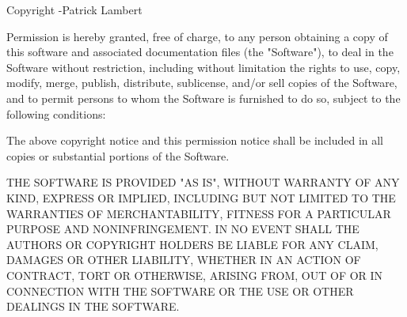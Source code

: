 \documentclass[11pt]{article}
\begin{document}
Copyright \textcopyright {}-\the\year \thinspace Patrick Lambert

Permission is hereby granted, free of charge, to any person obtaining a copy
of this software and associated documentation files (the "Software"), to deal
in the Software without restriction, including without limitation the rights
to use, copy, modify, merge, publish, distribute, sublicense, and/or sell
copies of the Software, and to permit persons to whom the Software is
furnished to do so, subject to the following conditions:

The above copyright notice and this permission notice shall be included in
all copies or substantial portions of the Software.

THE SOFTWARE IS PROVIDED "AS IS", WITHOUT WARRANTY OF ANY KIND, EXPRESS OR
IMPLIED, INCLUDING BUT NOT LIMITED TO THE WARRANTIES OF MERCHANTABILITY,
FITNESS FOR A PARTICULAR PURPOSE AND NONINFRINGEMENT. IN NO EVENT SHALL THE
AUTHORS OR COPYRIGHT HOLDERS BE LIABLE FOR ANY CLAIM, DAMAGES OR OTHER
LIABILITY, WHETHER IN AN ACTION OF CONTRACT, TORT OR OTHERWISE, ARISING FROM,
OUT OF OR IN CONNECTION WITH THE SOFTWARE OR THE USE OR OTHER DEALINGS IN
THE SOFTWARE.
\end{document}
